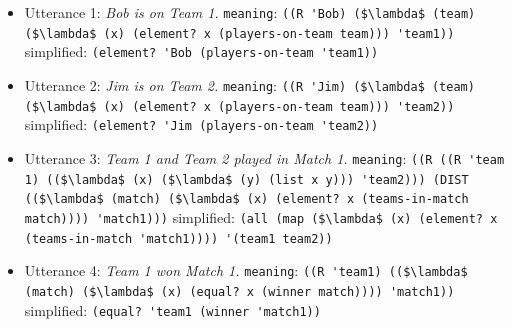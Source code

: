 \documentclass[pdfextras]{handbook}
\begin{document}
\begin{itemize}
\item Utterance 1: \emph{Bob is on Team 1.}
\subitem \lstinline{meaning}: \lstinline[mathescape]{((R 'Bob) ($\lambda$ (team) ($\lambda$ (x) (element? x (players-on-team team))) 'team1))}
\subitem simplified: \lstinline{(element? 'Bob (players-on-team 'team1))}
%
\item Utterance 2: \emph{Jim is on Team 2.}
\subitem \lstinline{meaning}: \lstinline[mathescape]{((R 'Jim) ($\lambda$ (team) ($\lambda$ (x) (element? x (players-on-team team))) 'team2))}
\subitem simplified: \lstinline{(element? 'Jim (players-on-team 'team2))}
%
\item Utterance 3: \emph{Team 1 and Team 2 played in Match 1.}
\subitem \lstinline{meaning}: \lstinline[mathescape]{((R ((R 'team 1) (($\lambda$ (x) ($\lambda$ (y) (list x y))) 'team2))) (DIST (($\lambda$ (match) ($\lambda$ (x) (element? x (teams-in-match match)))) 'match1)))}
\subitem simplified: \lstinline[mathescape]{(all (map ($\lambda$ (x) (element? x (teams-in-match 'match1)))) '(team1 team2))} 
%
\item Utterance 4: \emph{Team 1 won Match 1.}
\subitem \lstinline{meaning}:  \lstinline[mathescape]{((R 'team1) (($\lambda$ (match) ($\lambda$ (x) (equal? x (winner match)))) 'match1))}
\subitem simplified: \lstinline{(equal? 'team1 (winner 'match1))}
\end{itemize}
\end{document}

